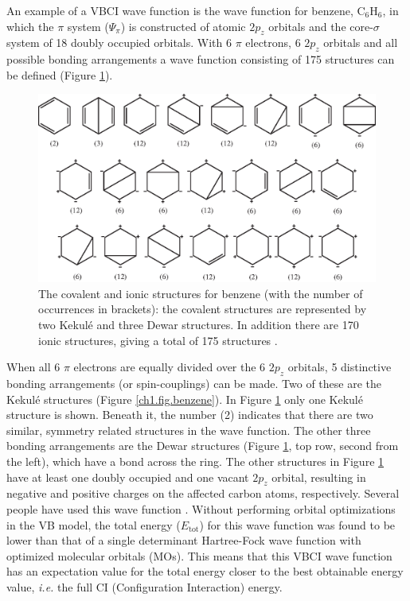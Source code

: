 An example of a VBCI wave function is the wave function for benzene, C$_6$H$_6$, in which the $\pi$ system ($\Psi_{\pi}$) is constructed of atomic $2p_z$ orbitals and the core-$\sigma$ system of 18 doubly occupied orbitals. With 6 $\pi$ electrons, 6 $2p_z$ orbitals and all possible bonding arrangements a wave function consisting of 175 structures can be defined (Figure \ref{ch1.fig.structures2}). 
\begin{figure}[htbp]
\center
\includegraphics[scale=0.9]{introduction/figures/allstructures.eps}
\caption{The covalent and ionic structures for benzene (with the number of occurrences in brackets): the covalent structures are represented by two Kekul\'e and three Dewar structures. In addition there are 170 ionic structures, giving a total of 175 structures \cite{chembrit}.}
\label{ch1.fig.structures2}
\end{figure}
When all 6 $\pi$ electrons are equally divided over the 6 $2p_z$ orbitals, 5 distinctive bonding arrangements (or spin-couplings) can be made. Two of these are the Kekul\'e structures (Figure \ref{ch1.fig.benzene}). In Figure \ref{ch1.fig.structures2} only one Kekul\'e structure is shown. Beneath it, the number (2) indicates that there are two similar, symmetry related structures in the wave function. The other three bonding arrangements are the Dewar structures (Figure \ref{ch1.fig.structures2}, top row, second from the left), which have a bond across the ring. The other structures in Figure \ref{ch1.fig.structures2} have at least one doubly occupied and one vacant $2p_z$ orbital, resulting in negative and positive charges on the affected carbon atoms, respectively. Several people have used this wave function \cite{vbci175_1,vbci175_2}. Without performing orbital optimizations in the VB model, the total energy ($E_\mathrm{tot}$) for this wave function was found to be lower than that of a single determinant Hartree-Fock wave function with optimized molecular orbitals (MOs). This means that this VBCI wave function has an expectation value for the total energy closer to the best obtainable energy value, \textit{i.e.} the full CI (Configuration Interaction) energy. 

